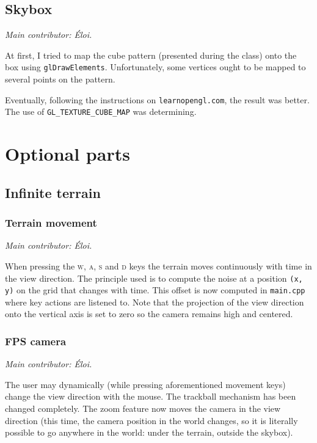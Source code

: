\documentclass[12pt]{article}
\begin{document}
\subsection{Skybox}

{\it Main contributor: Éloi.}

At first, I tried to map the cube pattern (presented during the class) onto the box using \texttt{glDrawElements}. Unfortunately, some vertices ought to be mapped to several points on the pattern.

Eventually, following the instructions on \texttt{learnopengl.com}, the result was better. The use of \texttt{\textsc{GL\_TEXTURE\_CUBE\_MAP}} was determining.


\section{Optional parts}

\subsection{Infinite terrain}

\subsubsection{Terrain movement}

{\it Main contributor: Éloi.}

When pressing the \textsc{w, a, s} and \textsc{d} keys the terrain moves continuously with time in the view direction. The principle used is to compute the noise at a position \texttt{(x, y)} on the grid that changes with time. This offset is now computed in \texttt{main.cpp} where key actions are listened to. Note that the projection of the view direction onto the vertical axis is set to zero so the camera remains high and centered.


\subsubsection{FPS camera}

{\it Main contributor: Éloi.}

The user may dynamically (while pressing aforementioned movement keys) change the view direction with the mouse. The trackball mechanism has been changed completely. The zoom feature now moves the camera in the view direction (this time, the camera position in the world changes, so it is literally possible to go anywhere in the world: under the terrain, outside the skybox).
\end{document}
